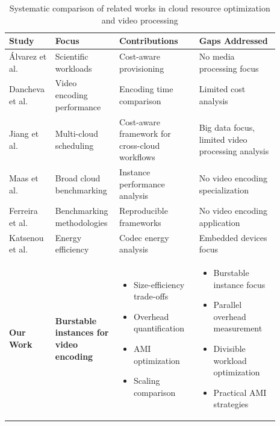 \documentclass[conference]{IEEEtran}
\begin{document}
	\begin{table}[!htbp]
		\centering
		\caption{Systematic comparison of related works in cloud resource optimization and video processing}
		\label{tab:comparative_analysis}
		\begin{tabular}{|p{0.15\linewidth}|p{0.18\linewidth}|p{0.28\linewidth}|p{0.28\linewidth}|}
			\hline
			\textbf{Study} & \textbf{Focus} & \textbf{Contributions} & \textbf{Gaps Addressed} \\
			\hline
			Álvarez et al. \cite{b2} & Scientific workloads & Cost-aware provisioning & No media processing focus \\
			\hline
			Dancheva et al. \cite{b3} & Video encoding performance & Encoding time comparison & Limited cost analysis \\
			\hline
			Jiang et al. \cite{b20} & Multi-cloud scheduling & Cost-aware framework for cross-cloud workflows & Big data focus, limited video processing analysis \\
			\hline
			Maas et al. \cite{b1} & Broad cloud benchmarking & Instance performance analysis & No video encoding specialization \\
			\hline
			Ferreira et al. \cite{b9} & Benchmarking methodologies & Reproducible frameworks & No video encoding application \\
			\hline
			Katsenou et al. \cite{b8} & Energy efficiency & Codec energy analysis & Embedded devices focus \\
			\hline
			\textbf{Our Work} & \textbf{Burstable instances for video encoding} & 
			\scriptsize
			\begin{itemize}
				\vspace{-0.2cm}
				\item Size-efficiency trade-offs
				\item Overhead quantification  
				\item AMI optimization
				\item Scaling comparison
				\vspace{-0.2cm}
			\end{itemize}
			& 
			\scriptsize
			\begin{itemize}
				\vspace{-0.2cm}
				\item Burstable instance focus
				\item Parallel overhead measurement
				\item Divisible workload optimization
				\item Practical AMI strategies
				\vspace{-0.2cm}
			\end{itemize}
			\\
			\hline
		\end{tabular}
	\end{table}
	
\end{document}
